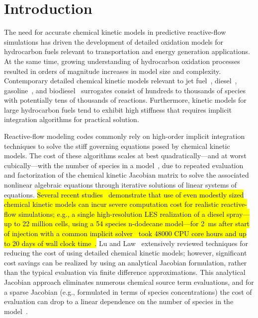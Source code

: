\documentclass[preprint,review,11pt]{elsarticle}
\DeclareRobustCommand{\hlg}[1]{\sethlcolor{green}\hl{#1}}
\DeclareRobustCommand{\hlg}[1]{\empty{#1}}
\begin{document}
\clearpage

\section{Introduction}
\label{sec:Intro}

The need for accurate chemical kinetic models in predictive reactive-flow simulations has driven the development of detailed oxidation models for hydrocarbon fuels relevant to transportation and energy generation applications.
At the same time, growing understanding of hydrocarbon oxidation processes resulted in orders of magnitude increases in model size and complexity.
Contemporary detailed chemical kinetic models relevant to jet fuel~\cite{Naik2011434}, diesel~\cite{Sarathy:2011kx}, gasoline~\cite{Mehl:2011jn}, and biodiesel~\cite{Herbinet:2010gu} surrogates consist of hundreds to thousands of species with potentially tens of thousands of reactions.
Furthermore, kinetic models for large hydrocarbon fuels tend to exhibit high stiffness that requires implicit integration algorithms for practical solution.

Reactive-flow modeling codes commonly rely on high-order implicit integration techniques to solve the stiff governing equations posed by chemical kinetic models.
The cost of these algorithms scales at best quadratically---and at worst cubically---with the number of species in a model~\cite{Lu:2009gh}, due to repeated evaluation and factorization of the chemical kinetic Jacobian matrix to solve the associated nonlinear algebraic equations through iterative solutions of linear systems of equations.
\hlg{Several recent studies~\cite{Huang20091814,Bottone2012,Moiz2016123} demonstrate that use of even modestly sized chemical kinetic models can incur severe computation cost for realistic reactive-flow simulations; e.g., a single high-resolution LES realization of a diesel spray---up to 22 million cells, using a 54 species n-dodecane model---for {\SI{2}{\milli\second}} after start of injection with a common implicit solver~\cite{cvode:2.8.2} took {\num{48000}} CPU core hours and up to {\num{20}} days of wall clock time~\cite{Moiz2016123}.}
Lu and Law~\cite{Lu:2009gh} extensively reviewed techniques for reducing the cost of using detailed chemical kinetic models; however, significant cost savings can be realized by using an analytical Jacobian formulation, rather than the typical evaluation via finite difference approximations.
This analytical Jacobian approach eliminates numerous chemical source term evaluations, and for a sparse Jacobian (e.g., formulated in terms of species concentrations) the cost of evaluation can drop to a linear dependence on the number of species in the model~\cite{Lu:2009gh}.
\end{document}
